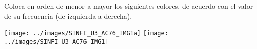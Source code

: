 Coloca en orden de menor a mayor los siguientes colores, de acuerdo con el valor de su frecuencia (de izquierda a derecha).
\begin{center}
    \ifprintanswers
        \texttt{[image: ../images/SINFI\_U3\_AC76\_IMG1a]}
    \else
         \qquad
         \qquad
         \qquad
         \qquad
         \qquad
         \qquad
        \texttt{[image: ../images/SINFI\_U3\_AC76\_IMG1]}
    \fi
\end{center}
